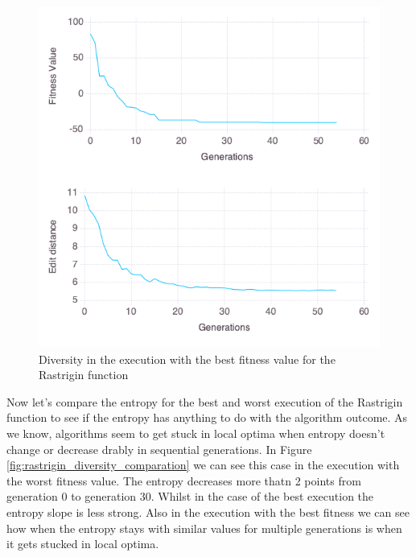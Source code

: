 \begin{figure}[]
	\centering	
	\includegraphics[scale=0.5]{./figures/config_file_10_Rastrigin_diversity.png}
	\caption{ Diversity in the execution with the best fitness value for the Rastrigin function }
    \label{fig:best_restrigin_diversity}
\end{figure}

Now let's compare the entropy for the best and worst execution of the Rastrigin function to see if the entropy has 
anything to do with the algorithm outcome. As we know, algorithms seem to get stuck in local optima when
entropy doesn't change or decrease drably in sequential generations. In Figure \ref{fig:rastrigin_diversity_comparation} we can see
this case in the execution with the worst fitness value. The entropy decreases more thatn 2 points from generation 0 to generation 30.
Whilst in the case of the best execution the entropy slope is less strong. Also in the execution with the best fitness we can see how
when the entropy stays with similar values for multiple generations is when it gets stucked in local optima.

